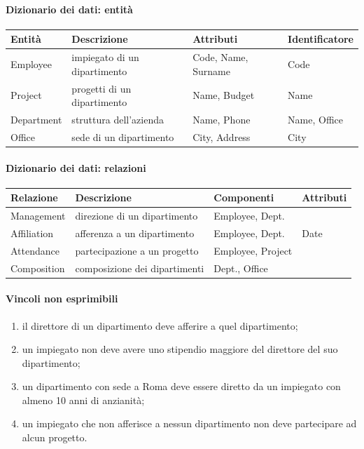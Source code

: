 \documentclass[a4paper,12pt]{article}
\begin{document}
\paragraph{Dizionario dei dati: entità}
\begin{center}
\begin{tabular}{|l|l|l|l|}
\hline
\textbf{Entità} & \textbf{Descrizione} & \textbf{Attributi} & \textbf{Identificatore}\\ \hline
Employee & impiegato di un dipartimento & Code, Name, Surname & Code\\
Project & progetti di un dipartimento & Name, Budget & Name\\
Department & struttura dell'azienda & Name, Phone & Name, Office\\
Office & sede di un dipartimento & City, Address & City\\ \hline
\end{tabular}
\end{center}

\paragraph{Dizionario dei dati: relazioni}
\begin{center}
\begin{tabular}{|l|l|l|l|}
\hline
\textbf{Relazione} & \textbf{Descrizione} & \textbf{Componenti} & \textbf{Attributi}\\ \hline
Management & direzione di un dipartimento & Employee, Dept. & \\
Affiliation & afferenza a un dipartimento & Employee, Dept. & Date\\
Attendance & partecipazione a un progetto & Employee, Project & \\
Composition & composizione dei dipartimenti & Dept., Office & \\ \hline
\end{tabular}
\end{center}

\paragraph{Vincoli non esprimibili}
\begin{enumerate}
  \item il direttore di un dipartimento deve afferire a quel dipartimento;
  \item un impiegato non deve avere uno stipendio maggiore del direttore del
    suo dipartimento;
  \item un dipartimento con sede a Roma deve essere diretto da un impiegato con
    almeno 10 anni di anzianità;
  \item un impiegato che non afferisce a nessun dipartimento non deve
    partecipare ad alcun progetto.
\end{enumerate}
\end{document}
